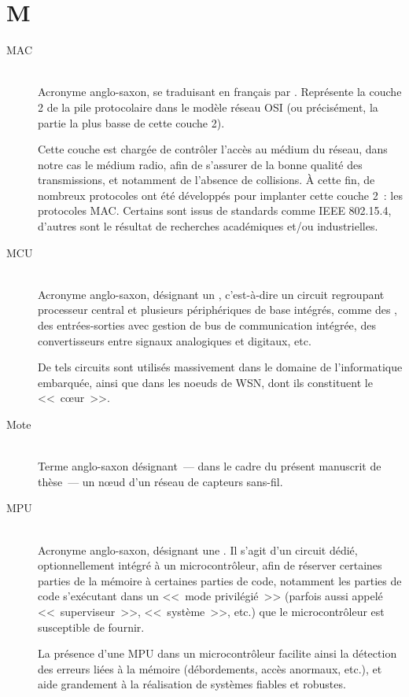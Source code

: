 
\section*{M}

\begin{description}

\item[MAC]  \\
Acronyme anglo-saxon, se traduisant en français par . Représente la couche 2 de la pile protocolaire
dans le modèle réseau OSI (ou précisément, la partie la plus basse de
cette couche 2).

Cette couche est chargée de contrôler l'accès au médium du réseau, dans
notre cas le médium radio, afin de s'assurer de la bonne qualité des
transmissions, et notamment de l'absence de collisions. \`A cette fin,
de nombreux protocoles ont été développés pour implanter cette couche 2~:
les protocoles MAC. Certains sont issus de standards comme IEEE 802.15.4,
d'autres sont le résultat de recherches académiques et/ou industrielles.

\item[MCU]  \\
Acronyme anglo-saxon, désignant un , c'est-à-dire
un circuit regroupant processeur central et plusieurs périphériques de
base intégrés, comme des , des entrées-sorties avec
gestion de bus de communication intégrée, des convertisseurs entre
signaux analogiques et digitaux, etc.

De tels circuits sont utilisés massivement dans le domaine de l'informatique
embarquée, ainsi que dans les noeuds de WSN, dont ils constituent le
<<~c{\oe}ur~>>.

\item[Mote] \ \\
Terme anglo-saxon désignant~--- dans le cadre du présent manuscrit de
thèse~--- un n{\oe}ud d'un réseau de capteurs sans-fil.

\item[MPU]  \\
Acronyme anglo-saxon, désignant une .
Il s'agit d'un circuit dédié, optionnellement intégré à un microcontrôleur,
afin de réserver certaines parties de la mémoire à certaines parties de
code, notamment les parties de code s'exécutant dans un <<~mode privilégié~>>
(parfois aussi appelé <<~superviseur~>>, <<~système~>>, etc.) que le
microcontrôleur est susceptible de fournir.

La présence d'une MPU dans un microcontrôleur facilite ainsi la détection
des erreurs liées à la mémoire (débordements, accès anormaux, etc.), et
aide grandement à la réalisation de systèmes fiables et robustes.

\end{description}

